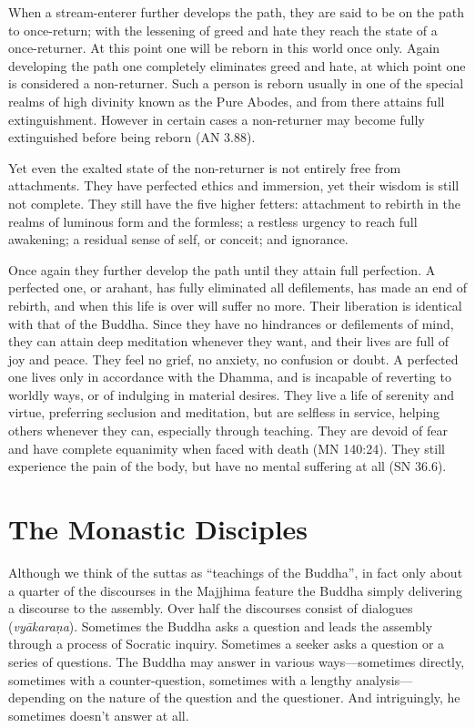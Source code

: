 \documentclass[12pt,openany]{book}%
\begin{document}
When a stream-enterer further develops the path, they are said to be on the path to once-return; with the lessening of greed and hate they reach the state of a once-returner. At this point one will be reborn in this world once only. Again developing the path one completely eliminates greed and hate, at which point one is considered a non-returner. Such a person is reborn usually in one of the special realms of high divinity known as the Pure Abodes, and from there attains full extinguishment. However in certain cases a non-returner may become fully extinguished before being reborn (AN 3.88).

Yet even the exalted state of the non-returner is not entirely free from attachments. They have perfected ethics and immersion, yet their wisdom is still not complete. They still have the five higher fetters: attachment to rebirth in the realms of luminous form and the formless; a restless urgency to reach full awakening; a residual sense of self, or conceit; and ignorance.

Once again they further develop the path until they attain full perfection. A perfected one, or arahant, has fully eliminated all defilements, has made an end of rebirth, and when this life is over will suffer no more. Their liberation is identical with that of the Buddha. Since they have no hindrances or defilements of mind, they can attain deep meditation whenever they want, and their lives are full of joy and peace. They feel no grief, no anxiety, no confusion or doubt. A perfected one lives only in accordance with the Dhamma, and is incapable of reverting to worldly ways, or of indulging in material desires. They live a life of serenity and virtue, preferring seclusion and meditation, but are selfless in service, helping others whenever they can, especially through teaching. They are devoid of fear and have complete equanimity when faced with death (MN 140:24). They still experience the pain of the body, but have no mental suffering at all (SN 36.6).

\section*{The Monastic Disciples}

Although we think of the suttas as “teachings of the Buddha”, in fact only about a quarter of the discourses in the Majjhima feature the Buddha simply delivering a discourse to the assembly. Over half the discourses consist of dialogues (\textit{\textsanskrit{vyākaraṇa}}). Sometimes the Buddha asks a question and leads the assembly through a process of Socratic inquiry. Sometimes a seeker asks a question or a series of questions. The Buddha may answer in various ways—sometimes directly, sometimes with a counter-question, sometimes with a lengthy analysis—depending on the nature of the question and the questioner. And intriguingly, he sometimes doesn’t answer at all.
\end{document}

